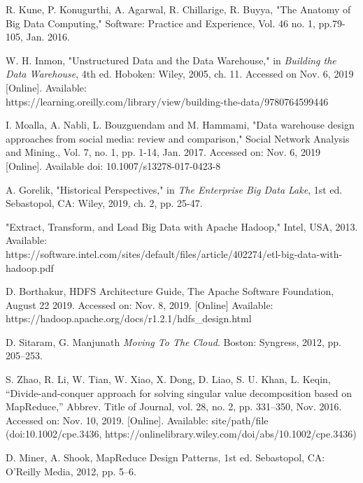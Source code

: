 \documentclass[journal]{IEEEtran}
\begin{document}
	\begin{thebibliography}{1}
		
		R. Kune, P. Konugurthi, A. Agarwal, R. Chillarige, R. Buyya,
		"The Anatomy of Big Data Computing," Software: Practice and Experience,
		Vol. 46 no. 1, pp.79-105, Jan. 2016. 
		
		W. H. Inmon, "Unstructured Data and the Data Warehouse," in 
		\emph{Building the Data Warehouse},
		4th ed. Hoboken: Wiley, 2005, ch. 11.
		Accessed on Nov. 6, 2019 [Online]. 
		Available: \\ https://learning.oreilly.com/library/view/building-the-data/9780764599446
		
		I. Moalla, A. Nabli, L. Bouzguendam and M. Hammami,
		"Data warehouse design approaches from social media: review and comparison,"
		Social Network Analysis and Mining., Vol. 7, no. 1, pp. 1-14, Jan. 2017.
		Accessed on: Nov. 6, 2019 [Online]. 
		Available doi: 10.1007/s13278-017-0423-8
		
		A. Gorelik, "Historical Perspectives," in 
		\emph{The Enterprise Big Data Lake},
		1st ed. Sebastopol, CA: Wiley, 2019, ch. 2, pp. 25-47.
		
		"Extract, Transform, and Load Big Data with Apache Hadoop," Intel, USA, 2013.
		Available:\\ https://software.intel.com/sites/default/files/article/402274/etl-big-data-with-hadoop.pdf
		
		D. Borthakur, HDFS Architecture Guide, The Apache Software Foundation,
		August 22 2019. Accessed on: Nov. 8, 2019. [Online] Available: \\
		https://hadoop.apache.org/docs/r1.2.1/hdfs\_design.html
		
		D. Sitaram, G. Manjunath \textit{Moving To The Cloud}. Boston: Syngress, 2012, pp. 205–253.
		
		S. Zhao, R. Li, W. Tian, W. Xiao, X. Dong, D. Liao, S. U. Khan, L. Keqin, “Divide-and-conquer approach for solving singular value decomposition based on MapReduce,” Abbrev. Title of Journal, vol. 28, no. 2, pp. 331–350, Nov. 2016. Accessed on: Nov. 10, 2019. [Online]. Available: site/path/file (doi:10.1002/cpe.3436, https://onlinelibrary.wiley.com/doi/abs/10.1002/cpe.3436)
		
	 D. Miner, A. Shook, MapReduce Design Patterns, 1st ed. Sebastopol, CA: O'Reilly Media, 2012, pp. 5–6.
		
	\end{thebibliography}
	
	
\end{document}
